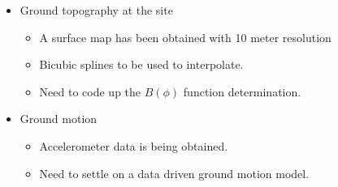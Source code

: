 \documentclass[]{article}
\begin{document}
{\begin{itemize}
\item[] Ground topography at the site
  \begin{itemize}
  \item A surface map has been obtained with 10 meter resolution
  \item Bicubic splines to be used to interpolate. 
  \item Need to code up the $B(\phi)$ function determination.
  \end{itemize}
\end{itemize}

\begin{itemize}
\item[] Ground motion
  \begin{itemize}
  \item Accelerometer data is being obtained. 
  \item Need to settle on a data driven ground motion model. 
  \end{itemize}
\end{itemize}

}




\end{document}
